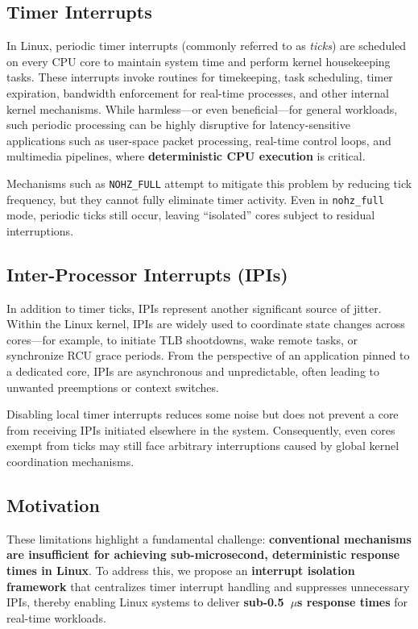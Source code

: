 \documentclass[letterpaper]{article}
\begin{document}
\subsection{Timer Interrupts}
In Linux, periodic timer interrupts (commonly referred to as \emph{ticks}) 
are scheduled on every CPU core to maintain system time and perform 
kernel housekeeping tasks. These interrupts invoke routines for 
timekeeping, task scheduling, timer expiration, bandwidth enforcement 
for real-time processes, and other internal kernel mechanisms. 
While harmless---or even beneficial---for general workloads, 
such periodic processing can be highly disruptive for 
latency-sensitive applications such as user-space packet processing, 
real-time control loops, and multimedia pipelines, where 
\textbf{deterministic CPU execution} is critical.  

Mechanisms such as \texttt{NOHZ\_FULL} attempt to mitigate this problem 
by reducing tick frequency, but they cannot fully eliminate timer activity. 
Even in \texttt{nohz\_full} mode, periodic ticks still occur, leaving 
``isolated'' cores subject to residual interruptions.  

\subsection{Inter-Processor Interrupts (IPIs)}
In addition to timer ticks, IPIs represent another significant source of 
jitter. Within the Linux kernel, IPIs are widely used to coordinate state 
changes across cores---for example, to initiate TLB shootdowns, 
wake remote tasks, or synchronize RCU grace periods. 
From the perspective of an application pinned to a dedicated core, 
IPIs are asynchronous and unpredictable, often leading to unwanted 
preemptions or context switches.  

Disabling local timer interrupts reduces some noise but does not prevent 
a core from receiving IPIs initiated elsewhere in the system. 
Consequently, even cores exempt from ticks may still face arbitrary 
interruptions caused by global kernel coordination mechanisms.  

\subsection{Motivation}
These limitations highlight a fundamental challenge: 
\textbf{conventional mechanisms are insufficient for achieving 
sub-microsecond, deterministic response times in Linux}. 
To address this, we propose an \textbf{interrupt isolation framework} 
that centralizes timer interrupt handling and suppresses unnecessary IPIs, 
thereby enabling Linux systems to deliver 
\textbf{sub-0.5~$\mu$s response times} for real-time workloads.  
\end{document}
